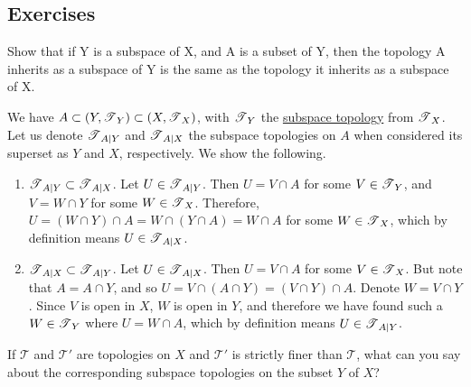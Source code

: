 \subsection{Exercises}

  \begin{exercise}[Munkres 16.1]
    Show that if Y is a subspace of X, and A is a subset of Y, then the topology A inherits as a subspace of Y is the same as the topology it inherits as a subspace of X.
  \end{exercise}
  \begin{solution}[Munkres 16.1]
    We have $A \subset (Y, \operatorname{\mathscr{T}}_Y) \subset (X, \operatorname{\mathscr{T}}_X)$, with $\operatorname{\mathscr{T}}_Y$ the \hyperref[def:subspace-topology]{subspace topology} from $\operatorname{\mathscr{T}}_X$. Let us denote $\operatorname{\mathscr{T}}_{A|Y}$ and $\operatorname{\mathscr{T}}_{A|X}$ the subspace topologies on $A$ when considered its superset as $Y$ and $X$, respectively. We show the following. 
    \begin{enumerate}
      \item $\operatorname{\mathscr{T}}_{A|Y} \subset \operatorname{\mathscr{T}}_{A|X}$. Let $U \in \operatorname{\mathscr{T}}_{A|Y}$. Then $U = V \cap A$ for some $V \in \operatorname{\mathscr{T}}_Y$, and $V = W \cap Y$ for some $W \in \operatorname{\mathscr{T}}_X$. Therefore, $U = (W \cap Y) \cap A = W \cap (Y \cap A) = W \cap A$ for some $W \in \operatorname{\mathscr{T}}_X$, which by definition means $U \in \operatorname{\mathscr{T}}_{A|X}$. 
      \item $\operatorname{\mathscr{T}}_{A|X} \subset \operatorname{\mathscr{T}}_{A|Y}$. Let $U \in \operatorname{\mathscr{T}}_{A|X}$. Then $U = V \cap A$ for some $V \in \operatorname{\mathscr{T}}_X$. But note that $A = A \cap Y$, and so $U = V \cap (A \cap Y) = (V \cap Y) \cap A$. Denote $W = V \cap Y$. Since $V$ is open in $X$, $W$ is open in $Y$, and therefore we have found such a $W \in \operatorname{\mathscr{T}}_Y$ where $U = W \cap A$, which by definition means $U \in \operatorname{\mathscr{T}}_{A|Y}$. 
    \end{enumerate}
  \end{solution}

  \begin{exercise}[Munkres 16.2]
    If $\mathcal{T}$ and $\mathcal{T}'$ are topologies on $X$ and $\mathcal{T}'$ is strictly finer than $\mathcal{T}$, what can you say about the corresponding subspace topologies on the subset $Y$ of $X$?
  \end{exercise}

